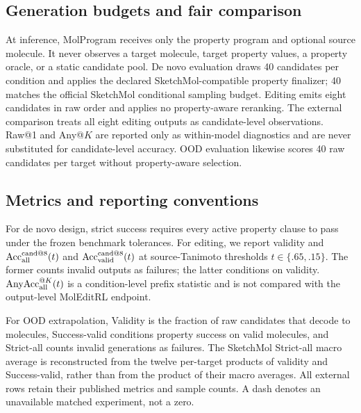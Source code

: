 \subsection{Generation budgets and fair comparison}
At inference, MolProgram receives only the property program and optional source
molecule. It never observes a target molecule, target property values, a
property oracle, or a static candidate pool. De novo evaluation draws 40
candidates per condition and applies the declared SketchMol-compatible
property finalizer; 40 matches the official SketchMol conditional sampling
budget. Editing emits eight candidates in raw order and applies no
property-aware reranking. The external comparison treats all eight editing
outputs as candidate-level observations. Raw@1 and Any@$K$ are reported only
as within-model diagnostics and are never substituted for candidate-level
accuracy. OOD evaluation likewise scores 40 raw candidates per target without
property-aware selection.

\subsection{Metrics and reporting conventions}
For de novo design, strict success requires every active property clause to
pass under the frozen benchmark tolerances. For editing, we report validity and
$\operatorname{Acc}^{\rm cand@8}_{\rm all}(t)$ and
$\operatorname{Acc}^{\rm cand@8}_{\rm valid}(t)$ at source-Tanimoto thresholds
$t\in\{.65,.15\}$. The former counts invalid outputs as failures; the latter
conditions on validity. $\operatorname{AnyAcc}^{@K}_{\rm all}(t)$ is a
condition-level prefix statistic and is not compared with the output-level
MolEditRL endpoint.

For OOD extrapolation, Validity is the fraction of raw candidates that decode
to molecules, Success-valid conditions property success on valid molecules,
and Strict-all counts invalid generations as failures. The SketchMol Strict-all
macro average is reconstructed from the twelve per-target products of validity
and Success-valid, rather than from the product of their macro averages. All
external rows retain their published metrics and sample counts. A dash denotes
an unavailable matched experiment, not a zero.
